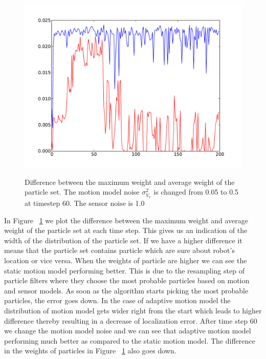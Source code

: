 \documentclass[12pt]{dalcsthesis}
\begin{document}
\begin{figure}[h!]
  \centering
     {\includegraphics[height = 3.0 in]{./plots/200_005_05_s_10_max_weight.pdf}}
  \caption{\label{fig-varying_sensor_noise_sensor_model_max_weight} Difference between the maximum weight and average weight of the particle set. The motion model noise $\sigma_{V_{v}}^{2}$ is changed from 0.05 to 0.5 at timestep 60. The sensor noise is 1.0 }
\end{figure}

In Figure ~\ref{fig-varying_sensor_noise_sensor_model_max_weight} we plot the difference between the maximum weight and average weight of the particle set at each time step. This gives us an indication of the width of the distribution of the particle set. If we have a higher difference it means that the particle set contains particle which are sure about robot's location or vice versa. When the weights of particle are higher we can see the static motion model performing better. This is due to the resampling step of particle filters where they choose the most probable particles based on motion and sensor models. As soon as the algorithm starts picking the most probable particles, the error goes down. In the case of adaptive motion model the distribution of motion model gets wider right from the start which leads to higher difference thereby resulting in a decrease of localization error. After time step 60 we change the motion model noise and we can see that adaptive motion model performing much better as compared to the static motion model. The difference in the weights of particles in Figure ~\ref{fig-varying_sensor_noise_sensor_model_max_weight} also goes down.
\end{document}
